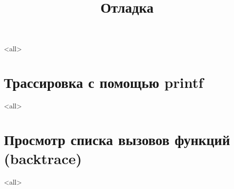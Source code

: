 

\title[Отладка]{Отладка}





\begin{frame}
	\frametitle{}
	\titlepage
	\vspace{-0.5cm}
	\begin{center}
	\end{center}
\end{frame}

\begin{frame}
	\tableofcontents
\end{frame}



\mode<all>{}

\section[printf]{Трассировка с помощью printf}

\mode<all>{}

\section[backtrace]{Просмотр списка вызовов функций (backtrace)}
\mode<all>{}



